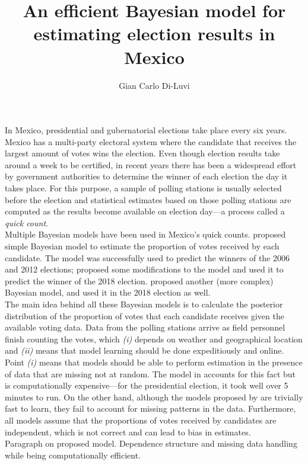 \documentclass[10pt]{article}
\title{\vspace{-2cm}An efficient Bayesian model for estimating election results in Mexico}
\author{Gian Carlo Di-Luvi}
\date{}
\begin{document}
\maketitle


In Mexico, presidential and gubernatorial elections take place every six years. Mexico has a multi-party electoral system where the candidate that receives the largest amount of votes wins the election. Even though election results take around a week to be certified, in recent years there has been a widespread effort by government authorities to determine the winner of each election the day it takes place. For this purpose, a sample of polling stations is usually selected before the election and statistical estimates based on those polling stations are computed as the results become available on election day---a process called a \textit{quick count}.
\\

Multiple Bayesian models have been used in Mexico's quick counts. \citet{mendoza-nieto2016} proposed simple Bayesian model to estimate the proportion of votes received by each candidate. The model was successfully used to predict the winners of the 2006 and 2012 elections; \citet{diluvi2018} proposed some modifications to the model and used it to predict the winner of the 2018 election. \citet{anzarut2018} proposed another (more complex) Bayesian model, and used it in the 2018 election as well.
\\


The main idea behind all these Bayesian models is to calculate the posterior distribution of the proportion of votes that each candidate receives given the available voting data. Data from the polling stations arrive as field personnel finish counting the votes, which \textit{(i)} depends on weather and geographical location and \textit{(ii)} means that model learning should be done expeditiously and online. Point \textit{(i)} means that models should be able to perform estimation in the presence of data that are missing not at random. The model in \citep{anzarut2018} accounts for this fact but is computationally expensive---for the presidential election, it took well over 5 minutes to run. On the other hand, although the models proposed by \citep{mendoza-nieto2016, diluvi2018} are trivially fast to learn, they fail to account for missing patterns in the data. Furthermore, all models assume that the proportions of votes received by candidates are independent, which is not correct and can lead to bias in estimates.
\\

Paragraph on proposed model. Dependence structure and missing data handling while being computationally efficient.


\clearpage
\printbibliography
\end{document}
